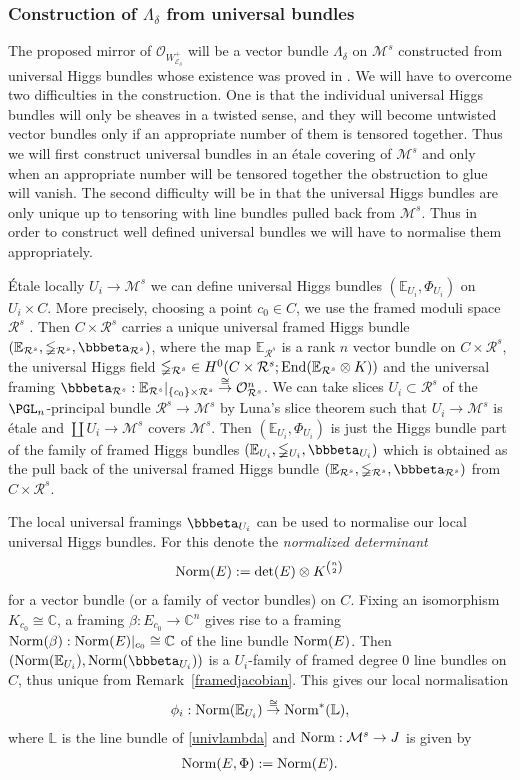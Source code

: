 \documentclass[12pt]{article}
\numberwithin{equation}{section}
\theoremstyle{remark}
\theoremstyle{definition}
\numberwithin{theorem}{section}
\def\beq{\begin{eqnarray}}
\def\eeq{\end{eqnarray}}
\def\calE{{\mathcal E}}
\def\Nm{{\rm Norm}}
\def\bE{{\mathbb{E}}}
\def\bPhi{{\mathbb{\Phi}}}
\def\E{\mathbb{E}}
\def\L{\mathbb{L}}
\def\C{\mathbb{C}}
\def\M{{\mathcal{M}}}
\def\calO{{\mathcal O}}
\newcommand{\calR}{\mathcal{R}}
\newcommand{\End}{\textnormal{End}}
\renewcommand{\1}{\mathbbm{1}}
\begin{document}
\subsubsection{Construction of $\Lambda_\delta$ from universal bundles}
\label{lambdadelta}
The proposed mirror of $\calO_{W^+_{\calE_\delta}}$ will be a vector bundle $\Lambda_\delta$ on $\M^s$ constructed from universal Higgs bundles whose existence was proved in \cite{simpson}. We will have to overcome two difficulties in the construction. One is that the individual universal Higgs bundles will only be sheaves in a twisted sense, and they will become untwisted vector bundles only if an appropriate number of them is tensored together. Thus we will first construct universal bundles in an \'etale covering of $\M^s$ and only when an appropriate number will be tensored together the obstruction to glue will vanish. The second difficulty will be in that the universal Higgs bundles are only unique up to tensoring with line bundles pulled back from $\M^s$. Thus in order to construct well defined universal bundles we will have to normalise them appropriately. 


\'Etale locally $U_i\to \M^s$ we can define  \cite[Theorem 4.7.(4)]{simpson1} universal Higgs bundles $(\bE_{U_i},\bPhi_{U_i})$ on $U_i\times C$.  More precisely,  choosing a point $c_0\in C$, we use the framed moduli space $\calR^s$ \cite[Theorem 4.10]{simpson1}. Then  $C\times \calR^s$ carries  a unique universal framed Higgs bundle $(\bE_{\calR^s},\bPhi_{\calR^s},\bbbeta_{\calR^s})$, where the map $\bE_{\calR^s}$ is a rank $n$ vector bundle on $C\times \calR^s$, the universal Higgs field $\bPhi_{\calR^s}\in H^0(C\times\calR^s; \End(\bE_{\calR^s}\otimes K))$ and the universal framing $\bbbeta_{\calR^s}:\bE_{\calR^s}|_{\{c_0\}\times \calR^s}\stackrel{\cong}{\to} \calO_{\calR^s}^n$. We can take slices $U_i\subset \calR^s$ of the $\PGL_n$-principal bundle $\calR^s\to \M^s$ by  Luna's slice theorem \cite[Theorem III.1]{luna} such that $U_i\to \M^s$ is \'etale and $\coprod U_i \to \M^s$ covers $\M^s$. Then $(\bE_{U_i},\bPhi_{U_i})$ is just the Higgs bundle part of the family of framed Higgs bundles $(\bE_{U_i},\bPhi_{U_i},\bbbeta_{U_i})$ which is obtained as the pull back of the universal framed Higgs bundle $(\bE_{\calR^s},\bPhi_{\calR^s},\bbbeta_{\calR^s})$ from $C\times \calR^s$.  

The local universal framings $\bbbeta_{U_i}$  can be  used to normalise our local universal Higgs bundles. For this denote the {\em normalized determinant} $$\Nm(E):=\det(E)\otimes K^{n \choose 2}$$ for a vector bundle (or a family of vector bundles) on $C$. Fixing an isomorphism $K_{c_0}\cong \C$, a framing $\beta:E_{c_0}\to 
\C^n$ gives rise to a framing $\Nm(\beta):\Nm(E)|_{c_0}\cong \C$ of the line bundle $\Nm(E)$.  Then $(\Nm(\E_{U_i}),\Nm(\bbbeta_{U_i}))$ is a $U_i$-family of framed degree $0$ line bundles on $C$, thus unique from Remark~\ref{framedjacobian}. This gives our local normalisation  \beq \label{determinant}\phi_i:\Nm(\bE_{U_i})\stackrel{\cong}{\to}\Nm^*(\L),\eeq where $\L$ is the line bundle of \eqref{univlambda} and $\Nm:\M^s\to J$ is  given by \beq \label{normdet} \Nm(E,\Phi):=\Nm(E).\eeq  
\end{document}
